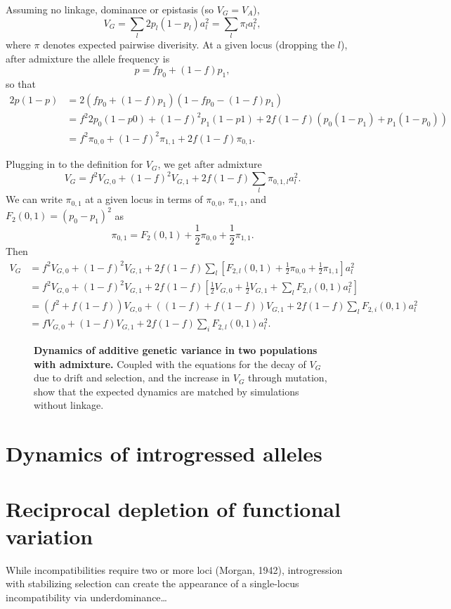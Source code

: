 \documentclass{article}
\begin{document}
Assuming no linkage, dominance or epistasis (so \(V_G=V_A\)),
\[V_G = \sum_l 2p_l(1-p_l)a_l^2 = \sum_l \pi_l a_l^2,\]
where $\pi$ denotes expected pairwise diverisity.
At a given locus (dropping the $l$), after admixture the allele frequency is
\[p=f p_0 + (1-f) p_1,\]
so that
\begin{align*}
    2p(1-p) & = 2(f p_0 + (1-f) p_1)(1 - f p_0 - (1-f) p_1) \\
    & = f^2 2p_0(1-p0) + (1-f)^2 p_1(1-p1) + 2f(1-f) (p_0(1-p_1) + p_1(1-p_0)) \\
    & = f^2 \pi_{0,0} + (1-f)^2 \pi_{1,1} + 2f(1-f)\pi_{0,1}.
\end{align*}

Plugging in to the definition for $V_G$, we get after admixture
\[V_G = f^2 V_{G,0} + (1-f)^2 V_{G,1} + 2f(1-f)\sum_l \pi_{0,1,l}a_l^2.\]
We can write $\pi_{0,1}$ at a given locus in terms of $\pi_{0,0}$, $\pi_{1,1}$,
and $F_2(0,1)=(p_0-p_1)^2$ as \citep{peter2016admixture}
\[\pi_{0,1} = F_2(0,1) + \frac{1}{2}\pi_{0,0} + \frac{1}{2}\pi_{1,1}.\]
Then
\begin{align*}
    V_G & = f^2 V_{G,0} + (1-f)^2 V_{G,1} + 2f(1-f)\sum_l \left[F_{2,l}(0,1)
    + \frac{1}{2}\pi_{0,0} + \frac{1}{2}\pi_{1,1}\right] a_l^2 \\
    & = f^2 V_{G,0} + (1-f)^2 V_{G,1} + 2f(1-f)\left[\frac{1}{2}V_{G,0} 
    + \frac{1}{2}V_{G,1} + \sum_l F_{2,l}(0,1)a_l^2\right] \\
    & = \left(f^2 + f(1-f)\right) V_{G,0} + \left((1-f) + f(1-f)\right)V_{G,1}
    + 2f(1-f) \sum_l F_{2,i}(0,1)a_l^2 \\
    & = f V_{G,0} + (1-f)V_{G,1} + 2f(1-f)\sum_i F_{2,l}(0,1)a_l^2.
\end{align*}


\begin{figure}[tb!]
    \centering
    \caption{
        \textbf{Dynamics of additive genetic variance in two populations with admixture.}
        Coupled with the equations for the decay of $V_G$ due to drift and selection,
        and the increase in $V_G$ through mutation, show that the expected dynamics
        are matched by simulations without linkage.
    }
    \label{fig:VG_dynamics}
\end{figure}

\section{Dynamics of introgressed alleles}

\section{Reciprocal depletion of functional variation}

While incompatibilities require two or more loci (Morgan, 1942), introgression
with stabilizing selection can create the appearance of a single-locus
incompatibility via underdominance\dots
\end{document}
